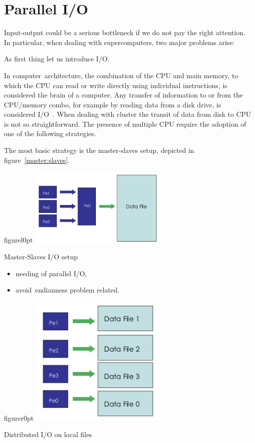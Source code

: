 \section{Parallel I/O}

Input-output could be a serious bottleneck if we do not pay the right attention.
In particular, when dealing with supercomputers, two major problems arise:

As first thing let us introduce I/O.\par
In computer~architecture, the combination of the CPU and main memory, to which the CPU can read or write directly using individual instructions, is considered the brain of a computer. Any transfer of information to or from the CPU/memory combo, for example by reading data from a disk drive, is considered I/O~\cite{io}.
When dealing with cluster the transit of data from disk to CPU is not so straightforward. The presence of multiple CPU require the adoption of one of the following strategies.\par
The most basic strategy is the master-slaves setup, depicted in figure~\ref{master:slaves}. 
\begin{wrapfloat}{figure}{l}{0pt}
\includegraphics[width=0.5\textwidth]{grafici/masterslave}
\caption{Master-Slaves I/O setup}
\label{master:slaves}
\end{wrapfloat}
\begin{itemize}
\item needing of parallel I/O,
\item avoid~endianness problem related.
\end{itemize}
\begin{wrapfloat}{figure}{r}{0pt}
\includegraphics[width=0.5\textwidth]{grafici/localio}
\caption{Distributed I/O on local files}
\end{wrapfloat}
